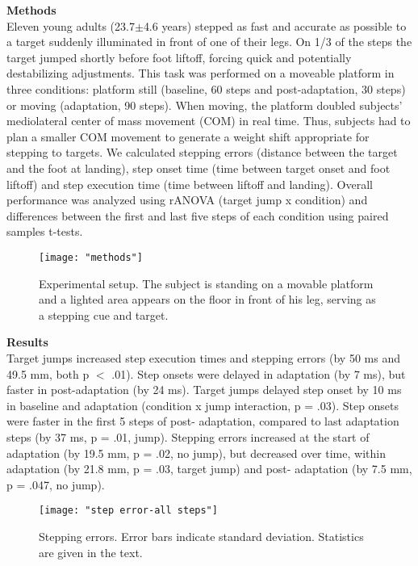 \textbf{Methods}\\
Eleven young adults (23.7$\pm$4.6 years) stepped as fast and accurate as possible to a target suddenly illuminated in front of one of their legs. On 1/3 of the steps the target jumped shortly before foot liftoff, forcing quick and potentially destabilizing adjustments. This task was performed on a moveable platform in three conditions: platform still (baseline, 60 steps and post-adaptation, 30 steps) or moving (adaptation, 90 steps). When moving, the platform doubled subjects’ mediolateral center of mass movement (COM) in real time. Thus, subjects had to plan a smaller COM movement to generate a weight shift appropriate for stepping to targets.
We calculated stepping errors (distance between the target and the foot at landing), step onset time (time between target onset and foot liftoff) and step execution time (time between liftoff and landing). Overall performance was analyzed using rANOVA (target jump x condition) and differences between the first and last five steps of each condition using paired samples t-tests.

\begin{figure*}
	\centering
	\texttt{[image: "methods"]}
	\caption{Experimental setup. The subject is standing on a movable platform and a lighted area appears on the floor in front of his leg, serving as a stepping cue and target.}
	\label{fig:expSetup}
	\vspace{-4 mm}
\end{figure*}

\textbf{Results}\\
Target jumps increased step execution times and stepping errors (by 50 ms and 49.5 mm, both p $<$ .01).  Step onsets were delayed in adaptation (by 7 ms), but faster in post-adaptation (by 24 ms). Target jumps delayed step onset by 10 ms in baseline and adaptation (condition x jump interaction, p = .03). Step onsets were faster in the first 5 steps of post- adaptation, compared to last adaptation steps (by 37 ms, p = .01, jump). Stepping errors increased at the start of adaptation (by 19.5 mm, p = .02, no jump), but decreased over time, within adaptation (by 21.8 mm, p = .03, target jump) and post- adaptation (by 7.5 mm, p = .047, no jump).

\begin{figure*}
	\centering
	\texttt{[image: "step error-all steps"]}
	\caption{Stepping errors. Error bars indicate standard deviation. Statistics are given in the text.}
	\label{fig:stepErrorAll}
\end{figure*}

